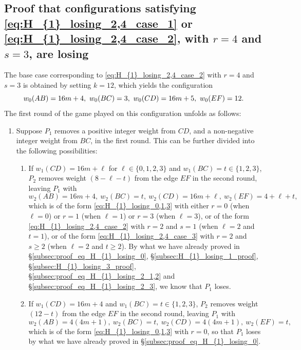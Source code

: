 \documentclass[11pt,reqno]{amsart}
\theoremstyle{definition}
\theoremstyle{definition}
\begin{document}
\subsection{Proof that configurations satisfying \eqref{eq:H_{1}_losing_2,4_case_1} or \eqref{eq:H_{1}_losing_2,4_case_2}, with $r=4$ and $s=3$, are losing}\label{subsec:H_{1}_losing_4_5,6_proof}
The base case corresponding to \eqref{eq:H_{1}_losing_2,4_case_2} with $r=4$ and $s=3$ is obtained by setting $k=12$, which yields the configuration
\begin{equation}
w_{0}(AB)=16m+4,\ w_{0}(BC)=3,\ w_{0}(CD)=16m+5,\ w_{0}(EF)=12.\label{eq:H_{1}_losing_4_5_base_case}
\end{equation}
The first round of the game played on this configuration unfolds as follows:
\begin{enumerate}
\item Suppose $P_{1}$ removes a positive integer weight from $CD$, and a non-negative integer weight from $BC$, in the first round. This can be further divided into the following possibilities:
\begin{enumerate}
\item If $w_{1}(CD)=16m+\ell$ for $\ell \in \{0,1,2,3\}$ and $w_{1}(BC)=t \in \{1,2,3\}$, $P_{2}$ removes weight $(8-\ell-t)$ from the edge $EF$ in the second round, leaving $P_{1}$ with
\begin{equation}
w_{2}(AB)=16m+4,\ w_{2}(BC)=t,\ w_{2}(CD)=16m+\ell,\ w_{2}(EF)=4+\ell+t,\nonumber
\end{equation}
which is of the form \eqref{eq:H_{1}_losing_0,1,3} with either $r=0$ (when $\ell=0$) or $r=1$ (when $\ell=1$) or $r=3$ (when $\ell=3$), or of the form \eqref{eq:H_{1}_losing_2,4_case_2} with $r=2$ and $s=1$ (when $\ell=2$ and $t=1$), or of the form \eqref{eq:H_{1}_losing_2,4_case_3} with $r=2$ and $s\geqslant 2$ (when $\ell=2$ and $t\geqslant 2$). By what we have already proved in \S\ref{subsec:proof_eq_H_{1}_losing_0}, \S\ref{subsec:H_{1}_losing_1_proof}, \S\ref{subsec:H_{1}_losing_3_proof}, \S\ref{subsec:proof_eq_H_{1}_losing_2_1,2} and \S\ref{subsec:proof_eq_H_{1}_losing_2_3}, we know that $P_{1}$ loses.

\item If $w_{1}(CD)=16m+4$ and $w_{1}(BC)=t \in \{1,2,3\}$, $P_{2}$ removes weight $(12-t)$ from the edge $EF$ in the second round, leaving $P_{1}$ with
\begin{equation}
w_{2}(AB)=4(4m+1),\ w_{2}(BC)=t,\ w_{2}(CD)=4(4m+1),\ w_{2}(EF)=t,\nonumber
\end{equation}
which is of the form \eqref{eq:H_{1}_losing_0,1,3} with $r=0$, so that $P_{1}$ loses by what we have already proved in \S\ref{subsec:proof_eq_H_{1}_losing_0}. 


\end{enumerate}
\end{enumerate}
\end{document}
